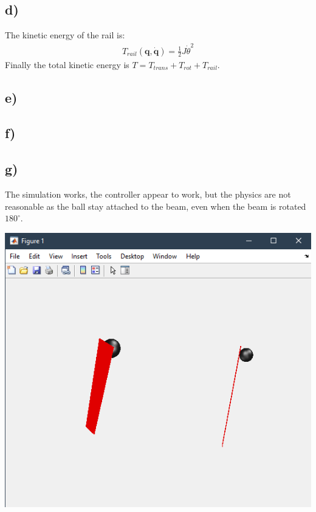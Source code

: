 \documentclass{article}
\begin{document}
\subsection*{d)}
The kinetic energy of the rail is:
\begin{align*}
    T_{rail}(\boldsymbol q, \boldsymbol {\dot q})
    = \frac{1}{2} J \dot\theta^2
\end{align*}
Finally the total kinetic energy is $T =T_{trans} + T_{rot} + T_{rail}$.

\subsection*{e)}


\subsection*{f)}


\subsection*{g)}
The simulation works, the controller appear to work, but the physics are not reasonable as the ball stay attached
to the beam, even when the beam is rotated $180^\circ$.




\includegraphics{task_2_simulation.png}
\end{document}
